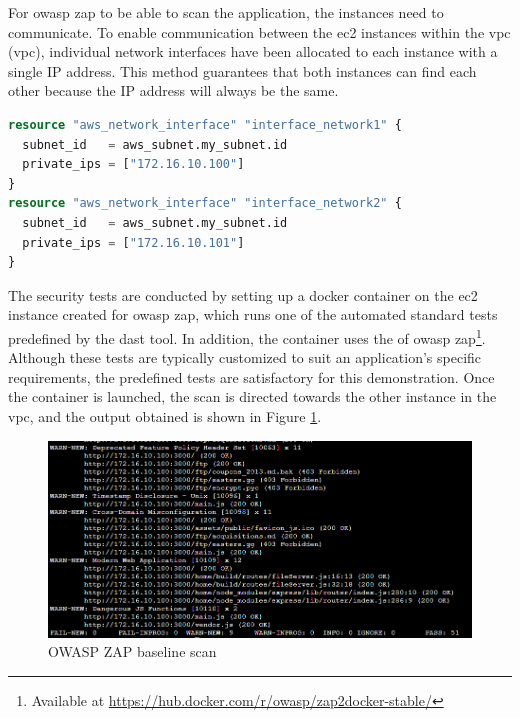 For \acrshort{owasp} \acrshort{zap} to be able to scan the application, the instances need to communicate. To enable communication between the \acrshort{ec2} instances within the \acrlong{vpc} (\acrshort{vpc}), individual network interfaces have been allocated to each instance with a single IP address. This method guarantees that both instances can find each other because the IP address will always be the same.

\vspace{2mm}
\begin{lstlisting}[language=terraform, caption=Allocate IP adresses, captionpos=b, frame=single]
resource "aws_network_interface" "interface_network1" {
  subnet_id   = aws_subnet.my_subnet.id
  private_ips = ["172.16.10.100"]
}
resource "aws_network_interface" "interface_network2" {
  subnet_id   = aws_subnet.my_subnet.id
  private_ips = ["172.16.10.101"] 
}
\end{lstlisting}

The security tests are conducted by setting up a docker container on the \acrshort{ec2} instance created for \acrshort{owasp} \acrshort{zap}, which runs one of the automated standard tests predefined by the \acrshort{dast} tool. In addition, the container uses the  of \acrshort{owasp} \acrshort{zap}\footnote{Available at \url{https://hub.docker.com/r/owasp/zap2docker-stable/}}. Although these tests are typically customized to suit an application's specific requirements, the predefined tests are satisfactory for this demonstration. Once the container is launched, the scan is directed towards the other instance in the \acrshort{vpc}, and the output obtained is shown in Figure \ref{fig: OWASP Zap baseline scan}.

\vspace{2mm}
\begin{figure}[H]
    \centering
    \includegraphics[width=0.8\columnwidth]{Images/owasp-zap-scan.png}
    \caption{OWASP ZAP baseline scan}
    \label{fig: OWASP Zap baseline scan}
\end{figure}


